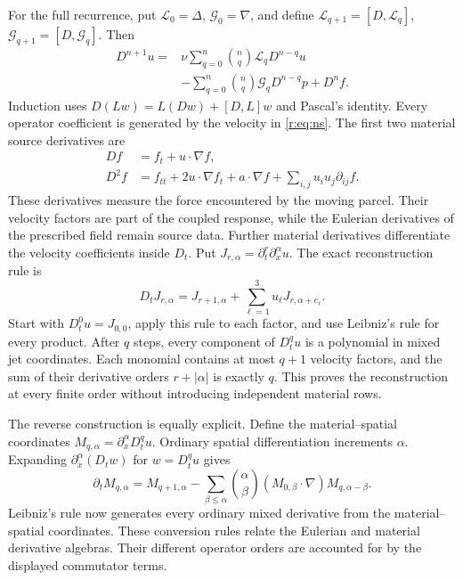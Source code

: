 For the full recurrence, put
\(\mathcal L_0=\Delta\), \(\mathcal G_0=\nabla\), and define
\(\mathcal L_{q+1}=[D,\mathcal L_q]\),
\(\mathcal G_{q+1}=[D,\mathcal G_q]\). Then
\begin{equation}
 \begin{aligned}
 D^{n+1}u={}&\nu\sum_{q=0}^n\binom nq\mathcal L_qD^{n-q}u\\
 &-\sum_{q=0}^n\binom nq\mathcal G_qD^{n-q}p+D^nf.
 \end{aligned}
 \label{r:eq:material-binomial}
\end{equation}
Induction uses \(D(Lw)=L(Dw)+[D,L]w\) and Pascal's identity.
Every operator coefficient is generated by the velocity in \eqref{r:eq:ns}.
The first two material source derivatives are
\[
 \begin{aligned}
 Df&=f_t+u\cdot\nabla f,\\
 D^2f&=f_{tt}+2u\cdot\nabla f_t
 +a\cdot\nabla f+\sum_{i,j}u_i u_j\partial_{ij}f.
 \end{aligned}
\]
These derivatives measure the force encountered by the moving parcel.
Their velocity factors are part of the coupled response, while the
Eulerian derivatives of the prescribed field remain source data.
Further material derivatives differentiate the velocity coefficients inside
\(D_t\). Put \(J_{r,\alpha}=\partial_t^r\partial_x^\alpha u\).
The exact reconstruction rule is
\begin{equation}
 D_tJ_{r,\alpha}
 =J_{r+1,\alpha}+\sum_{\ell=1}^3
      u_\ell J_{r,\alpha+e_\ell}.
 \label{r:eq:material-jet-reconstruction}
\end{equation}
Start with \(D_t^0u=J_{0,0}\), apply this rule to each factor, and use
Leibniz's rule for every product. After \(q\) steps, every component of
\(D_t^qu\) is a polynomial in mixed jet coordinates. Each monomial
contains at most \(q+1\) velocity factors, and the sum of their
derivative orders \(r+|\alpha|\) is exactly \(q\). This proves
the reconstruction at every finite order without introducing
independent material rows.

The reverse construction is equally explicit. Define the material--spatial
coordinates \(M_{q,\alpha}=\partial_x^\alpha D_t^qu\). Ordinary
spatial differentiation increments \(\alpha\). Expanding
\(\partial_x^\alpha(D_tw)\) for \(w=D_t^qu\) gives
\begin{equation}
 \partial_tM_{q,\alpha}
 =M_{q+1,\alpha}
 -\sum_{\beta\le\alpha}\binom\alpha\beta
       (M_{0,\beta}\cdot\nabla)M_{q,\alpha-\beta}.
 \label{r:eq:eulerian-jet-reconstruction}
\end{equation}
Leibniz's rule now generates every ordinary mixed derivative from the
material--spatial coordinates. These conversion rules relate the Eulerian and material derivative
algebras. Their different operator orders are accounted for by
the displayed commutator terms.

